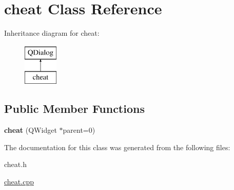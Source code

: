 \hypertarget{classcheat}{\section{cheat Class Reference}
\label{classcheat}
}
Inheritance diagram for cheat\-:\begin{figure}[H]
\begin{center}
\leavevmode
\includegraphics[height=2.000000cm]{classcheat}
\end{center}
\end{figure}
\subsection*{Public Member Functions}
\begin{DoxyCompactItemize}
\item 
\hypertarget{classcheat_af46a9a0276d8ace2bc3f4e835fb153b5}{{\bfseries cheat} (Q\-Widget $\ast$parent=0)}\label{classcheat_af46a9a0276d8ace2bc3f4e835fb153b5}

\end{DoxyCompactItemize}


The documentation for this class was generated from the following files\-:\begin{DoxyCompactItemize}
\item 
cheat.\-h\item 
\hyperlink{cheat_8cpp}{cheat.\-cpp}\end{DoxyCompactItemize}
